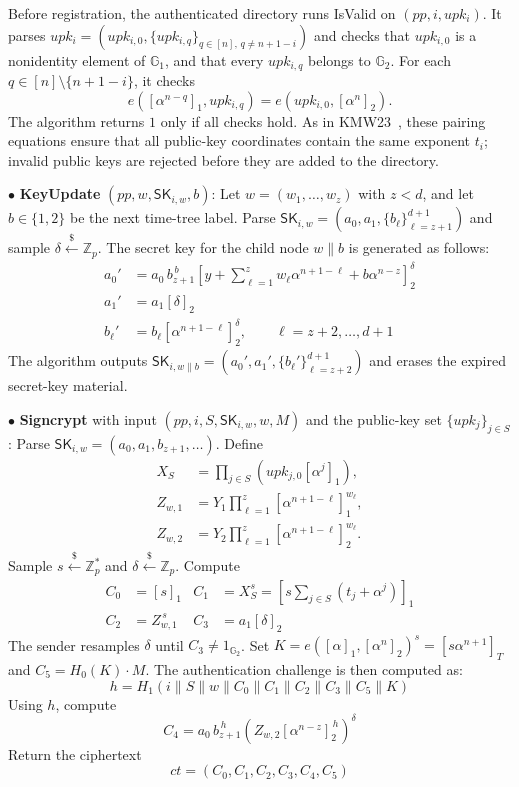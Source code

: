 \documentclass[sigconf,anonymous]{acmart}
\theoremstyle{definition}
\theoremstyle{definition}
\theoremstyle{definition}
\theoremstyle{definition}
\theoremstyle{definition}
\theoremstyle{definition}
\theoremstyle{definition}
\theoremstyle{definition}
\theoremstyle{definition}
\begin{document}
Before registration, the authenticated directory runs \textsf{IsValid} on
$(pp,i,upk_i)$. It parses
$upk_i=(upk_{i,0},\{upk_{i,q}\}_{q\in[n],\,q\neq n+1-i})$
and checks that $upk_{i,0}$ is a nonidentity element of $\mathbb{G}_1$,
and that every $upk_{i,q}$ belongs to $\mathbb{G}_2$. For each
$q\in[n]\setminus\{n+1-i\}$, it checks
\[
e\left([\alpha^{n-q}]_1,upk_{i,q}\right)
=
e\left(upk_{i,0},[\alpha^n]_2\right).
\]
The algorithm returns $1$ only if all checks hold. As in KMW23~\cite{kolonelos2023distributed}, these pairing equations ensure that all public-key coordinates contain the same exponent $t_i$; invalid public keys are rejected before they are added to the directory.

\noindent$\bullet$ \textbf{KeyUpdate}
$(pp,w,\mathsf{SK}_{i,w},b)$:
Let $w=(w_1,\ldots,w_z)$ with $z<d$, and let $b\in\{1,2\}$ be the
next time-tree label. Parse
$\mathsf{SK}_{i,w}=(a_0,a_1,\{b_\ell\}_{\ell=z+1}^{d+1})$ and sample
$\delta\overset{\$}{\leftarrow}\mathbb{Z}_p$. The secret key for the
child node $w\|b$ is generated as follows:
\[
\begin{aligned}
	a_0'
	&=
	a_0\,b_{z+1}^{\,b}
	\left[
	y+
	\sum_{\ell=1}^{z}
	w_\ell\alpha^{n+1-\ell}
	+
	b\alpha^{n-z}
	\right]_2^{\delta}
	\\
	a_1'
	&=
	a_1[\delta]_2
	\\
	b_\ell'
	&=
	b_\ell[\alpha^{n+1-\ell}]_2^{\delta},
	\qquad
	\ell=z+2,\ldots,d+1
\end{aligned}
\]
The algorithm outputs
$\mathsf{SK}_{i,w\|b}
=(a_0',a_1',\{b_\ell'\}_{\ell=z+2}^{d+1})$
and erases the expired secret-key material.

\noindent$\bullet$ \textbf{Signcrypt}
with input $(pp,i,S,\mathsf{SK}_{i,w},w,M)$ and the public-key set
$\{upk_j\}_{j\in S}$:
Parse $\mathsf{SK}_{i,w}=(a_0,a_1,b_{z+1},\ldots)$.
Define
\[
\begin{aligned}
X_S
&=\prod_{j\in S}(upk_{j,0}[\alpha^j]_1),\\
Z_{w,1}
&=Y_1\prod_{\ell=1}^{z}[\alpha^{n+1-\ell}]_1^{w_\ell},\\
Z_{w,2}
&=Y_2\prod_{\ell=1}^{z}[\alpha^{n+1-\ell}]_2^{w_\ell}.
\end{aligned}
\]
Sample $s\overset{\$}{\leftarrow}\mathbb{Z}_p^{*}$ and
$\delta\overset{\$}{\leftarrow}\mathbb{Z}_p$. Compute
\[
\begin{aligned}
	C_0
	&=
	[s]_1
	&
	C_1
	&=
	X_S^s
	=
	\left[
	s\sum_{j\in S}(t_j+\alpha^j)
	\right]_1
	\\
	C_2
	&=
	Z_{w,1}^{\,s}
	&
	C_3
	&=
	a_1[\delta]_2
\end{aligned}
\]
The sender resamples $\delta$ until $C_3\neq 1_{\mathbb{G}_2}$.
Set $K=e([\alpha]_1,[\alpha^n]_2)^s=[s\alpha^{n+1}]_T$ and
$C_5=H_0(K)\cdot M$. The authentication challenge is then computed as:
\[
h=
H_1\left(
i\parallel S\parallel w\parallel
C_0\parallel C_1\parallel C_2\parallel C_3\parallel
C_5\parallel K
\right)
\]
Using $h$, compute
\[
C_4
=
a_0\,b_{z+1}^{\,h}
\left(
Z_{w,2}[\alpha^{n-z}]_2^{\,h}
\right)^{\delta}
\]
Return the ciphertext
\[
ct=(C_0,C_1,C_2,C_3,C_4,C_5)
\]
\end{document}
